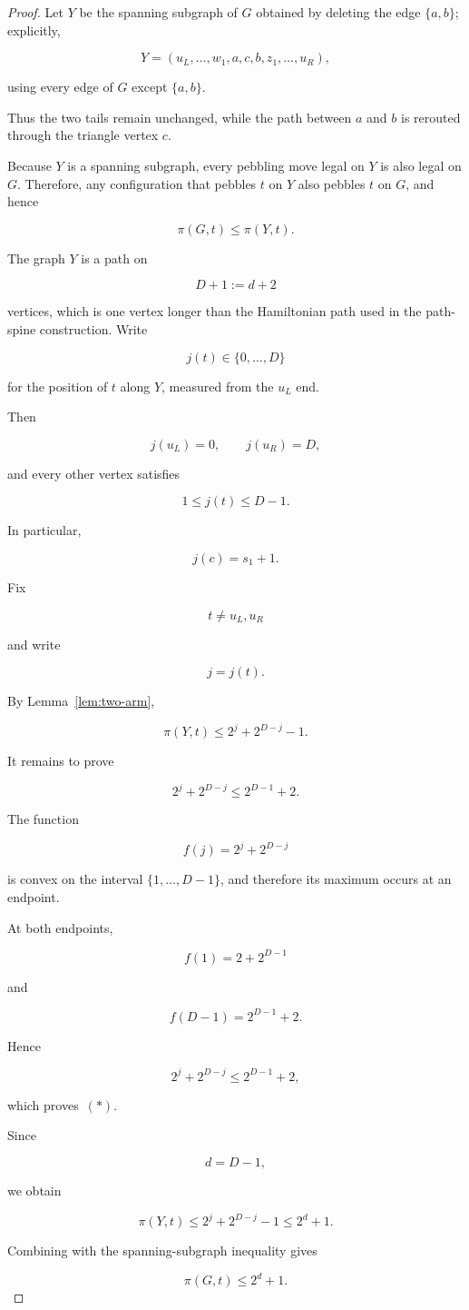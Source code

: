 \begin{proof}

Let $Y$ be the spanning subgraph of $G$ obtained by deleting the edge
$\{a,b\}$; explicitly,

\[
Y=
(u_L,\ldots,w_1,a,c,b,z_1,\ldots,u_R),
\]

using every edge of $G$ except $\{a,b\}$.

Thus the two tails remain unchanged, while the path between $a$ and $b$ is
rerouted through the triangle vertex $c$.

Because $Y$ is a spanning subgraph, every pebbling move legal on $Y$ is also
legal on $G$. Therefore, any configuration that pebbles $t$ on $Y$ also pebbles
$t$ on $G$, and hence

\[
\pi(G,t)\le \pi(Y,t).
\]


The graph $Y$ is a path on

\[
D+1:=d+2
\]

vertices, which is one vertex longer than the Hamiltonian path used in the
path-spine construction. Write

\[
j(t)\in\{0,\ldots,D\}
\]

for the position of $t$ along $Y$, measured from the $u_L$ end.

Then

\[
j(u_L)=0,\qquad j(u_R)=D,
\]

and every other vertex satisfies

\[
1\le j(t)\le D-1.
\]

In particular,

\[
j(c)=s_1+1.
\]


Fix

\[
t\neq u_L,u_R
\]

and write

\[
j=j(t).
\]

By Lemma~\ref{lem:two-arm},

\[
\pi(Y,t)\le 2^j+2^{D-j}-1.
\]

It remains to prove

\[
2^j+2^{D-j}\le 2^{D-1}+2.
\tag{$\ast$}
\]

The function

\[
f(j)=2^j+2^{D-j}
\]

is convex on the interval
$\{1,\ldots,D-1\}$, and therefore its maximum occurs at an endpoint.

At both endpoints,

\[
f(1)=2+2^{D-1}
\]

and

\[
f(D-1)=2^{D-1}+2.
\]

Hence

\[
2^j+2^{D-j}\le 2^{D-1}+2,
\]

which proves~$(\ast)$.

Since

\[
d=D-1,
\]

we obtain

\[
\pi(Y,t)
\le
2^j+2^{D-j}-1
\le
2^d+1 .
\]

Combining with the spanning-subgraph inequality gives

\[
\pi(G,t)\le2^d+1 .
\]

\end{proof}



